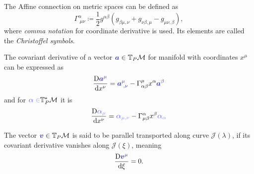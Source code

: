 \begin{definition}
The Affine connection on metric spaces can be defined as
    \begin{equation}
        \Gamma^{\alpha}_{\;\mu\nu} \coloneqq \frac{1}{2}g^{\alpha \beta}\left(g_{\beta\mu,\nu}+g_{\nu\beta,\mu}-g_{\mu\nu,\beta}\right),
    \end{equation}
    where \emph{comma notation} for coordinate derivative is used. Its elements are called the \emph{Christoffel symbols}.
\end{definition}
    The covariant derivative of a vector $\bluee{\bm a}\in \T_P\M$ for manifold with coordinates $x^\mu$ can be expressed as
    \begin{equation}
        \Der{\bluee{\bm a^\mu}}{x^\nu}=\bluee{\bm a_{\;,\nu}^\mu}-\Gamma^\mu_{\alpha\beta} x^\alpha \bluee{\bm a^\beta}
    \end{equation}
    and for $\blueee{\bm\alpha\in} \T_P^*\M$ it is
\begin{equation}
    \Der{\blueee{\bm \alpha_\mu}}{x^\nu}=\blueee{\bm \alpha_{\mu,\nu}}-\Gamma^\alpha_{\mu\beta}x^\beta \blueee{\bm \alpha_\alpha}
\end{equation}

The vector $\bluee{\bm v}\in \T_P\M$ is said to be parallel transported along curve $\mathcal J(\lambda)$, if its covariant derivative vanishes along $\mathcal J(\xi)$, meaning
\begin{equation}
    \Der{\bluee{\bm v^\mu}}{\xi}=0.
\end{equation}


